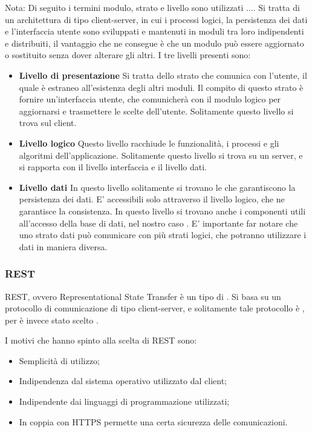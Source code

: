 Nota: Di seguito i termini modulo, strato e livello sono utilizzati .... 
Si tratta di un architettura di tipo client-server, in cui i processi logici, la persistenza dei dati e l'interfaccia utente sono sviluppati e mantenuti in moduli tra loro indipendenti e distribuiti, il vantaggio che ne consegue è che un modulo può essere aggiornato o sostituito senza dover alterare gli altri.
I tre livelli presenti sono:
\begin{itemize}
\item \textbf{Livello di presentazione} Si tratta dello strato che comunica con l'utente, il quale è estraneo all'esistenza degli altri moduli. Il compito di questo strato è fornire un'interfaccia utente, che comunicherà con il modulo logico per aggiornarsi e trasmettere le scelte dell'utente. Solitamente questo livello si trova sul client.
\item \textbf{Livello logico} Questo livello racchiude le funzionalità, i processi e gli algoritmi dell'applicazione. Solitamente questo livello si trova su un server, e si rapporta con il livello interfaccia e il livello dati. 
\item \textbf{Livello dati} In questo livello solitamente si trovano le  che garantiscono la persistenza dei dati. E' accessibili solo attraverso il livello logico, che ne garantisce la consistenza. In questo livello si trovano anche i componenti utili all'accesso della base di dati, nel nostro caso .
E' importante far notare che uno strato dati può comunicare con più strati logici, che potranno utilizzare i dati in maniera diversa.
\end{itemize}


\subsubsection{REST}

REST, ovvero Representational State Transfer è un tipo di . Si basa su un protocollo di comunicazione  di tipo client-server, e solitamente tale protocollo è , per \ProjectName è invece stato scelto .

I motivi che hanno spinto alla scelta di REST sono:
\begin{itemize}
\item Semplicità di utilizzo;
\item Indipendenza dal sistema operativo utilizzato dal client;
\item Indipendente dai linguaggi di programmazione utilizzati;
\item In coppia con HTTPS permette una certa sicurezza delle comunicazioni.
\end{itemize}

